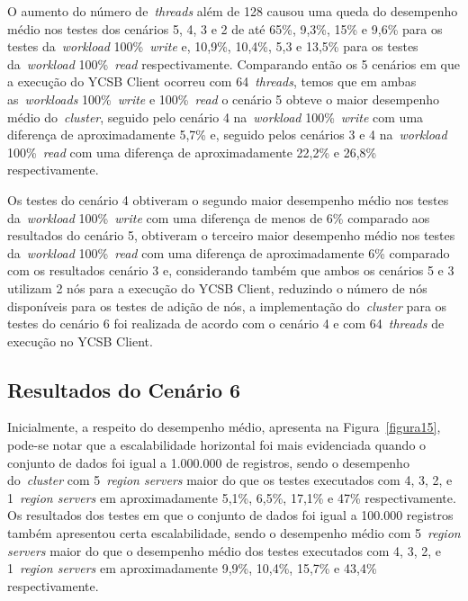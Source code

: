 \documentclass[12pt]{article}
\begin{document}
O aumento do número de~\emph{threads} além de 128 causou uma queda do desempenho médio nos testes dos cenários 5, 4, 3 e 2 de até 65\%, 9,3\%, 15\% e 9,6\% para os testes da~\emph{workload} 100\%~\emph{write} e, 10,9\%, 10,4\%, 5,3 e 13,5\% para os testes da~\emph{workload} 100\%~\emph{read} respectivamente. 
Comparando então os 5 cenários em que a execução do YCSB Client ocorreu com 64~\emph{threads}, temos que em ambas as~\emph{workloads} 100\%~\emph{write} e 100\%~\emph{read} o cenário 5 obteve o maior desempenho médio do~\emph{cluster}, seguido pelo cenário 4 na~\emph{workload} 100\%~\emph{write} com uma diferença de aproximadamente 5,7\% e, seguido pelos cenários 3 e 4 na~\emph{workload} 100\%~\emph{read} com uma diferença de aproximadamente 22,2\% e 26,8\% respectivamente.

Os testes do cenário 4 obtiveram o segundo maior desempenho médio nos testes da~\emph{workload} 100\%~\emph{write} com uma diferença de menos de 6\% comparado aos resultados do cenário 5, obtiveram o terceiro maior desempenho médio nos testes da~\emph{workload} 100\%~\emph{read} com uma diferença de aproximadamente 6\% comparado com os resultados cenário 3 e, considerando também que ambos os cenários 5 e 3 utilizam 2 nós para a execução do YCSB Client, reduzindo o número de nós disponíveis para os testes de adição de nós, a implementação do~\emph{cluster} para os testes do cenário 6 foi realizada de acordo com o cenário 4 e com 64~\emph{threads} de execução no YCSB Client.


\subsection{Resultados do Cenário 6}

Inicialmente, a respeito do desempenho médio, apresenta na Figura~\ref{figura15}, pode-se notar que a escalabilidade horizontal foi mais evidenciada quando o conjunto de dados foi igual a 1.000.000 de registros, sendo o desempenho do~\emph{cluster} com 5~\emph{region servers} maior do que os testes executados com 4, 3, 2, e 1~\emph{region servers} em aproximadamente 5,1\%, 6,5\%, 17,1\% e 47\% respectivamente. 
Os resultados dos testes em que o conjunto de dados foi igual a 100.000 registros também apresentou certa escalabilidade, sendo o desempenho médio com 5~\emph{region servers} maior do que o desempenho médio dos testes executados com 4, 3, 2, e 1~\emph{region servers} em aproximadamente 9,9\%, 10,4\%, 15,7\% e 43,4\% respectivamente.
\end{document}
